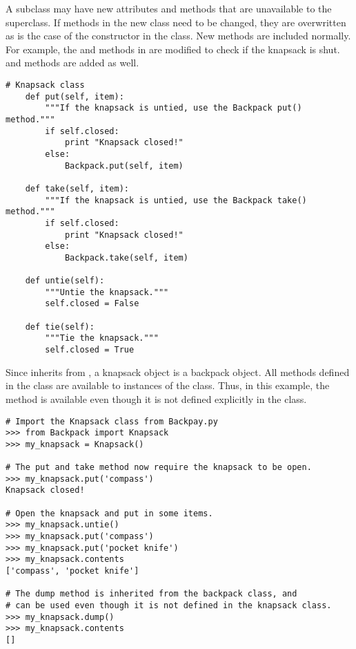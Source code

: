 A subclass may have new attributes and methods that are unavailable to the superclass.
If methods in the new class need to be changed, they are overwritten as is the case of the constructor in the  class.
New methods are included normally.
For example, the  and  methods in  are modified to check if the knapsack is shut. 
 and  methods are added as well.

\begin{lstlisting}
# Knapsack class
    def put(self, item):
        """If the knapsack is untied, use the Backpack put() method."""
        if self.closed:
            print "Knapsack closed!"
        else:
            Backpack.put(self, item)
    
    def take(self, item):
        """If the knapsack is untied, use the Backpack take() method."""
        if self.closed:
            print "Knapsack closed!"
        else:
            Backpack.take(self, item)
    
    def untie(self):
        """Untie the knapsack."""
        self.closed = False
    
    def tie(self):
        """Tie the knapsack."""
        self.closed = True
\end{lstlisting}

Since  inherits from , a knapsack object is a backpack object.
All methods defined in the  class are available to instances of the  class.
Thus, in this example, the  method is available even though it is not defined explicitly in the  class.

\begin{lstlisting}
# Import the Knapsack class from Backpay.py
>>> from Backpack import Knapsack
>>> my_knapsack = Knapsack()

# The put and take method now require the knapsack to be open.
>>> my_knapsack.put('compass')
Knapsack closed!

# Open the knapsack and put in some items.
>>> my_knapsack.untie()
>>> my_knapsack.put('compass')
>>> my_knapsack.put('pocket knife')
>>> my_knapsack.contents
['compass', 'pocket knife']

# The dump method is inherited from the backpack class, and
# can be used even though it is not defined in the knapsack class.
>>> my_knapsack.dump()
>>> my_knapsack.contents
[]
\end{lstlisting}

